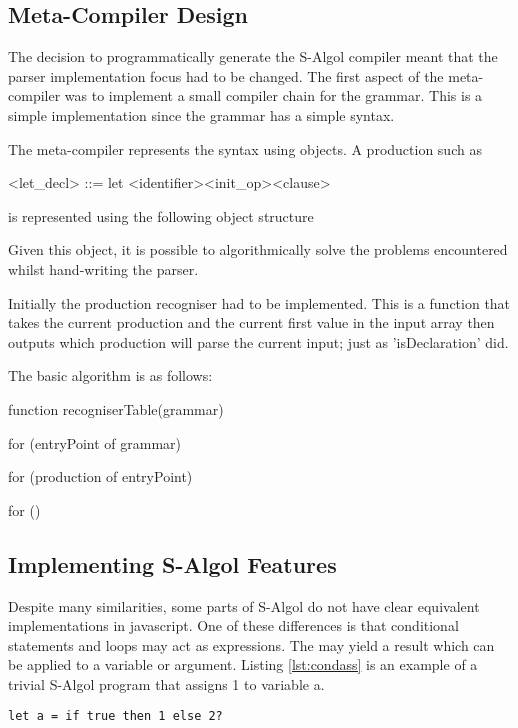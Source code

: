 \documentclass{article}
\begin{document}
\subsection{Meta-Compiler Design}

The decision to programmatically generate the S-Algol compiler meant that the parser implementation focus had to be changed. The first aspect of the meta-compiler was to implement a small compiler chain for the grammar. This is a simple implementation since the grammar has a simple syntax.  

The meta-compiler represents the syntax using objects. A production such as 

<let_decl> ::= let <identifier><init_op><clause>

is represented using the following object structure


Given this object, it is possible to algorithmically solve the problems encountered whilst hand-writing the parser.

Initially the production recogniser had to be implemented. This is a function that takes the current production and the current first value in the input array then outputs which production will parse the current input; just as 'isDeclaration' did.

The basic algorithm is as follows:

function recogniserTable(grammar) {
	for (entryPoint of grammar) {
		for (production of entryPoint) {
			for () {
			
			}
		}
	}
}

\subsection{Implementing S-Algol Features}

Despite many similarities, some parts of S-Algol do not have clear equivalent implementations in javascript. One of these differences is that conditional statements and loops may act as expressions. The may yield a result which can be applied to a variable or argument. Listing \ref{lst:condass} is an example of a trivial S-Algol program that assigns 1 to variable a.

\begin{lstlisting}[caption={S-Algol conditional assignment},label={lst:condass}]
let a = if true then 1 else 2?
\end{lstlisting}
\end{document}
